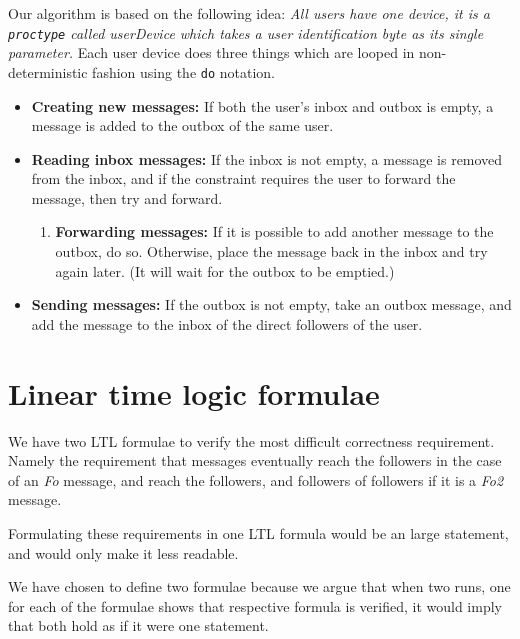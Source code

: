\documentclass[9pt,a4paper]{article}
\begin{document}
	Our algorithm is based on the following idea:
	\textit{All users have one device, it is a \texttt{proctype} called userDevice which takes a user identification byte as its single parameter.}
	Each user device does three things which are looped in non-deterministic fashion using the \texttt{do} notation.
	\begin{itemize}
		\item \textbf{Creating new messages:} If both the user's inbox and outbox is empty, a message is added to the outbox of the same user.
		\item \textbf{Reading inbox messages:} If the inbox is not empty, a message is removed from the inbox, and if the constraint requires the user to forward the message, then try and forward.
		\begin{enumerate}
			\item \textbf{Forwarding messages:} If it is possible to add another message to the outbox, do so. Otherwise, place the message back in the inbox and try again later. (It will wait for the outbox to be emptied.)
		\end{enumerate}
		\item \textbf{Sending messages:} If the outbox is not empty, take an outbox message, and add the message to the inbox of the direct followers of the user.
	\end{itemize}
	
	\section{Linear time logic formulae}
	We have two LTL formulae to verify the most difficult correctness requirement.
	Namely the requirement that messages eventually reach the followers in the case of an \textit{Fo} message, and reach the followers, and followers of followers if it is a \textit{Fo2} message.
	
	Formulating these requirements in one LTL formula would be an large statement, and would only make it less readable.
	
	We have chosen to define two formulae because we argue that when two runs, one for each of the formulae shows that respective formula is verified, it would imply that both hold as if it were one statement.
	
\end{document}
